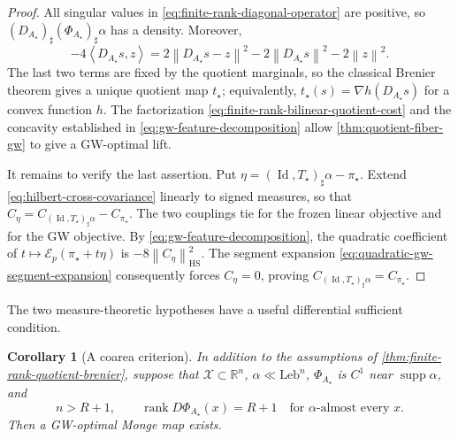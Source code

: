 \documentclass[11pt,a4paper]{article}
\newtheorem{corollary}[theorem]{Corollary}
\theoremstyle{definition}
\theoremstyle{remark}
\newcommand{\R}{\mathbb R}
\newcommand{\Ecal}{\mathcal E}
\newcommand{\Id}{\operatorname{Id}}
\newcommand{\supp}{\operatorname{supp}}
\newcommand{\rank}{\operatorname{rank}}
\newcommand{\HS}{\operatorname{HS}}
\newcommand{\norm}[1]{\left\lVert #1\right\rVert}
\newcommand{\ip}[2]{\left\langle #1,#2\right\rangle}
\begin{document}
\begin{proof}
All singular values in \eqref{eq:finite-rank-diagonal-operator} are positive,
so \((D_{A_\star})_\sharp(\Phi_{A_\star})_\sharp\alpha\) has a density.
Moreover,
\begin{equation*}
  -4\ip{D_{A_\star}s}{z}
  =2\norm{D_{A_\star}s-z}^2
   -2\norm{D_{A_\star}s}^2-2\norm{z}^2.
\end{equation*}
The last two terms are fixed by the quotient marginals, so the classical
Brenier theorem gives a unique quotient map \(t_\star\); equivalently,
\(t_\star(s)=\nabla h(D_{A_\star}s)\) for a convex function \(h\).
The factorization
\eqref{eq:finite-rank-bilinear-quotient-cost} and
the concavity established in \eqref{eq:gw-feature-decomposition} allow
\cref{thm:quotient-fiber-gw} to give a GW-optimal lift.

It remains to verify the last assertion.  Put
\(
  \eta=(\Id,T_\star)_\sharp\alpha-\pi_\star.
\)
Extend \eqref{eq:hilbert-cross-covariance} linearly to signed measures, so
that \(C_\eta=C_{(\Id,T_\star)_\sharp\alpha}-C_{\pi_\star}\).
The two couplings tie for the frozen linear objective and for the GW
objective.  By \eqref{eq:gw-feature-decomposition}, the quadratic coefficient
of \(t\mapsto\Ecal_p(\pi_\star+t\eta)\) is
\(-8\norm{C_\eta}_{\HS}^2\).  The segment expansion
\eqref{eq:quadratic-gw-segment-expansion} consequently forces
\(C_\eta=0\), proving
\(C_{(\Id,T_\star)_\sharp\alpha}=C_{\pi_\star}\).
\end{proof}

The two measure-theoretic hypotheses have a useful differential sufficient
condition.

\begin{corollary}[A coarea criterion]
\label{cor:finite-rank-coarea-brenier}
In addition to the assumptions of
\cref{thm:finite-rank-quotient-brenier}, suppose that
\(\mathcal X\subset\R^n\), \(\alpha\ll\mathrm{Leb}^n\),
\(\Phi_{A_\star}\) is \(C^1\) near \(\supp\alpha\), and
\begin{equation}
  n>R+1,
  \qquad
  \rank D\Phi_{A_\star}(x)=R+1
  \quad\text{for \(\alpha\)-almost every \(x\)}.
  \label{eq:finite-rank-coarea-condition}
\end{equation}
Then a GW-optimal Monge map exists.
\end{corollary}
\end{document}

